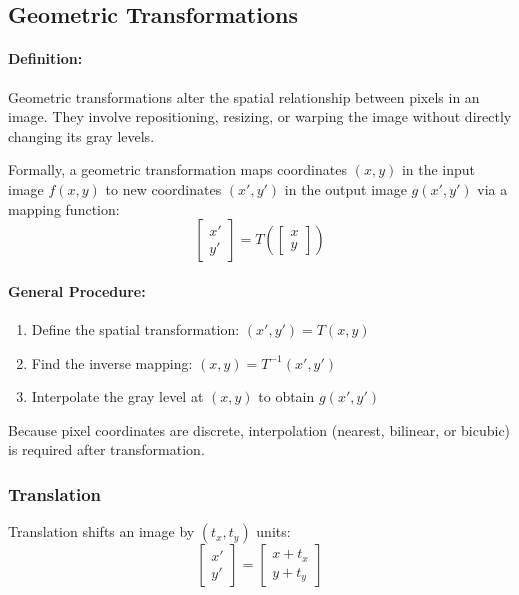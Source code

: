 \documentclass[12pt,a4paper]{AnantDocumentation}
\begin{document}
\subsection{Geometric Transformations}

\paragraph{Definition:}
Geometric transformations alter the spatial relationship between pixels in an image.  
They involve repositioning, resizing, or warping the image without directly changing its gray levels.

Formally, a geometric transformation maps coordinates $(x, y)$ in the input image $f(x, y)$ to new coordinates $(x', y')$ in the output image $g(x', y')$ via a mapping function:
\begin{equation}
\begin{bmatrix} x' \\ y' \end{bmatrix}
= T \left( \begin{bmatrix} x \\ y \end{bmatrix} \right)
\end{equation}

\paragraph{General Procedure:}
\begin{enumerate}
\item Define the spatial transformation: $(x', y') = T(x, y)$
\item Find the inverse mapping: $(x, y) = T^{-1}(x', y')$
\item Interpolate the gray level at $(x, y)$ to obtain $g(x', y')$
\end{enumerate}
Because pixel coordinates are discrete, interpolation (nearest, bilinear, or bicubic) is required after transformation.

\subsubsection{Translation}
Translation shifts an image by $(t_x, t_y)$ units:
\begin{equation}
\begin{bmatrix} x' \\ y' \end{bmatrix}
= 
\begin{bmatrix} x + t_x \\ y + t_y \end{bmatrix}
\end{equation}
\end{document}
